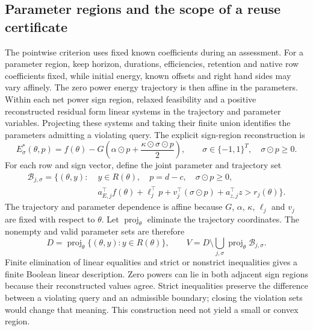 \subsection{Parameter regions and the scope of a reuse certificate}
The pointwise criterion uses fixed known coefficients during an assessment.
For a parameter region, keep horizon, durations, efficiencies, retention and
native row coefficients fixed, while initial energy, known offsets and
right hand sides may vary affinely. The zero power energy trajectory is
then affine in the parameters. Within each net power sign region, relaxed
feasibility and a positive reconstructed residual form linear systems in
the trajectory and parameter variables. Projecting these systems and taking
their finite union identifies the parameters admitting a violating query.
The explicit sign-region reconstruction is
\begin{equation}
E^*_{\sigma}(\theta,p)=f(\theta)-G\left(\alpha\odot p+
\frac{\kappa\odot\sigma\odot p}{2}\right),\qquad
\sigma\in\{-1,1\}^T,\quad \sigma\odot p\geq0.
\label{eq:parameter_sign_lift}
\end{equation}
For each row and sign vector, define the joint parameter and trajectory set
\begin{equation}
\begin{split}
\mathcal B_{j,\sigma}=\bigl\{(\theta,y):\;&y\in R(\theta),\quad
p=d-c,\quad\sigma\odot p\geq0,\\
&a_{E,j}^{\top}f(\theta)+\ell_j^{\top}p+
v_j^{\top}(\sigma\odot p)+a_{z,j}^{\top}z>r_j(\theta)\bigr\}.
\end{split}\label{eq:parameter_bad_set}
\end{equation}
The trajectory and parameter dependence is affine because $G$, $\alpha$,
$\kappa$, $\ell_j$ and $v_j$ are fixed with respect to $\theta$.
Let $\operatorname{proj}_{\theta}$ eliminate the trajectory coordinates.
The nonempty and valid parameter sets are therefore
\begin{equation}
D=\operatorname{proj}_{\theta}\{(\theta,y):y\in R(\theta)\},\qquad
V=D\setminus\bigcup_{j,\sigma}\operatorname{proj}_{\theta}\mathcal B_{j,\sigma}.
\label{eq:parameter_region_projection}
\end{equation}
Finite elimination of linear equalities and strict or nonstrict inequalities
gives a finite Boolean linear description. Zero powers can lie in both
adjacent sign regions because their reconstructed values agree. Strict
inequalities preserve the difference between a violating query and an
admissible boundary; closing the violation sets would change that meaning.
This construction need not yield a small or convex region.

